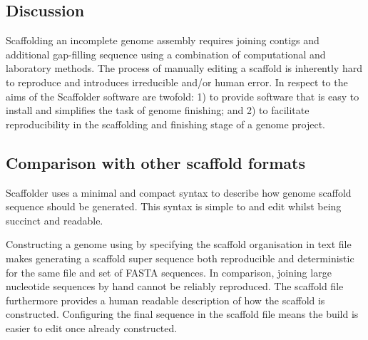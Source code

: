 \documentclass[10pt]{bmc_article}
\newenvironment{bmcformat}{\begin{raggedright}\baselineskip20pt\sloppy\setboolean{publ}{false}}{\end{raggedright}\baselineskip20pt\sloppy}
\begin{document}
\begin{bmcformat}
\clearpage

\section*{Discussion} %

Scaffolding an incomplete genome assembly requires joining contigs and
additional gap-filling sequence using a combination of computational and
laboratory methods. The process of manually editing a scaffold is inherently
hard to reproduce and introduces irreducible
 and/or human error. In respect to  the aims of the Scaffolder software are twofold: 1) to provide
software that is easy to install and simplifies the task of genome finishing;
and 2) to facilitate reproducibility in the scaffolding and finishing stage of
a genome project. \pb

\subsection*{Comparison with other scaffold formats} %

 Scaffolder  uses a minimal and
compact syntax to describe how  genome scaffold sequence should
be generated. This syntax is simple to  and edit
whilst being succinct and readable. 

 \pb

Constructing a genome using by specifying the scaffold organisation in text
file makes generating a scaffold super sequence both reproducible and
deterministic for the same file and set of FASTA sequences. In comparison,
joining large nucleotide sequences by hand cannot be reliably reproduced. The
scaffold file furthermore provides a human readable description of how the
scaffold is constructed. Configuring the final sequence in the scaffold file
means the build is easier to edit once already constructed. \pb


\end{bmcformat}
\end{document}
